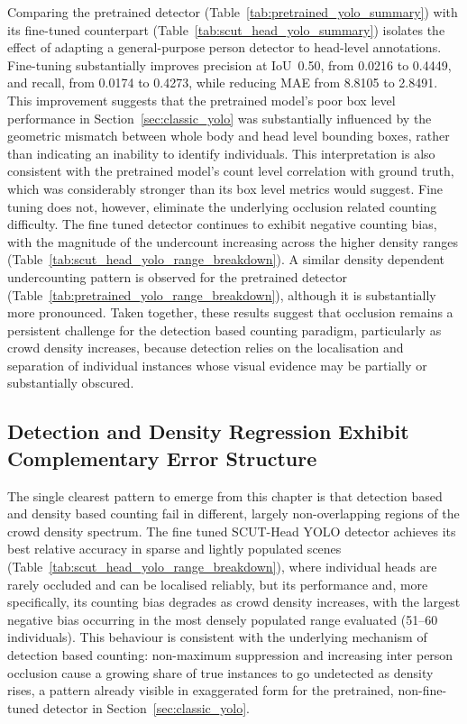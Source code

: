 Comparing the pretrained detector (Table~\ref{tab:pretrained_yolo_summary}) with its fine-tuned counterpart (Table~\ref{tab:scut_head_yolo_summary}) isolates the effect of adapting a general-purpose person detector to head-level annotations. Fine-tuning substantially improves precision at IoU~0.50, from 0.0216 to 0.4449, and recall, from 0.0174 to 0.4273, while reducing MAE from 8.8105 to 2.8491. This improvement suggests that the pretrained model's poor box level performance in Section~\ref{sec:classic_yolo} was substantially influenced by the geometric mismatch between whole body and head level bounding boxes, rather than indicating an inability to identify individuals. This interpretation is also consistent with the pretrained model's count level correlation with ground truth, which was considerably stronger than its box level metrics would suggest. Fine tuning does not, however, eliminate the underlying occlusion related counting difficulty. The fine tuned detector continues to exhibit negative counting bias, with the magnitude of the undercount increasing across the higher density ranges (Table~\ref{tab:scut_head_yolo_range_breakdown}). A similar density dependent undercounting pattern is observed for the pretrained detector (Table~\ref{tab:pretrained_yolo_range_breakdown}), although it is substantially more pronounced. Taken together, these results suggest that occlusion remains a persistent challenge for the detection based counting paradigm, particularly as crowd density increases, because detection relies on the localisation and separation of individual instances whose visual evidence may be partially or substantially obscured.

\subsection{Detection and Density Regression Exhibit Complementary Error Structure}
\label{sec:discussion_complementary}

The single clearest pattern to emerge from this chapter is that detection based and density based counting fail in different, largely non-overlapping regions of the crowd density spectrum. The fine tuned SCUT-Head YOLO detector achieves its best relative accuracy in sparse and lightly populated scenes (Table~\ref{tab:scut_head_yolo_range_breakdown}), where individual heads are rarely occluded and can be localised reliably, but its performance and, more specifically, its counting bias degrades as crowd density increases, with the largest negative bias occurring in the most densely populated range evaluated (51--60 individuals). This behaviour is consistent with the underlying mechanism of detection based counting: non-maximum suppression and increasing inter person occlusion cause a growing share of true instances to go undetected as density rises, a pattern already visible in exaggerated form for the pretrained, non-fine-tuned detector in Section~\ref{sec:classic_yolo}.

